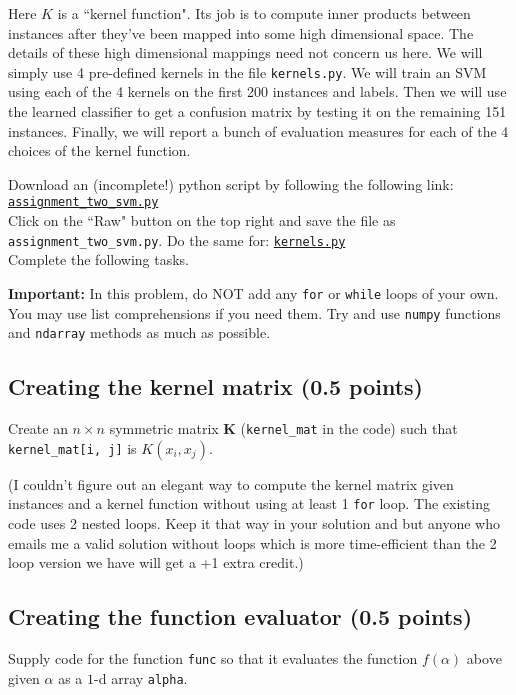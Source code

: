 \documentclass{article}
\begin{document}
Here $K$ is a ``kernel function". Its job is to compute inner products between instances after they've been mapped into some high dimensional space.
The details of these high dimensional mappings need not concern us here. We will simply use 4 pre-defined kernels in the file {\tt kernels.py}.
We will train an SVM using each of the 4 kernels on the first 200 instances and labels. Then we will use the learned classifier
to get a confusion matrix by testing it on the remaining 151 instances. Finally, we will report a bunch of evaluation measures for each
of the 4 choices of the kernel function.

Download an (incomplete!) python script by following the following
link:\\
\href{https://github.com/ambujtewari/stats607a-fall2017/blob/master/homeworks/assignment_two_svm.py}{\tt assignment\_two\_svm.py} \\
Click on the ``Raw" button on the top right and save the file as {\tt assignment\_two\_svm.py}.
Do the same for:
\href{https://github.com/ambujtewari/stats607a-fall2017/blob/master/homeworks/kernels.py}{\tt kernels.py} \\
Complete the following tasks.

{\bf Important:} In this problem, do NOT add any {\tt for} or {\tt while} loops of your own. You may use list comprehensions if you need them.
Try and use {\tt numpy} functions and {\tt ndarray} methods as much as possible.

\subsection{Creating the kernel matrix (0.5 points)}
Create an $n \times n$ symmetric matrix $\mathbf{K}$ ({\tt kernel\_mat} in the code) such that {\tt kernel\_mat[i, j]} is $K(x_i, x_j)$.

(I couldn't figure out an elegant way to compute the kernel matrix given instances and a kernel function without using at least 1 {\tt for}
loop. The existing code uses 2 nested loops. Keep it that way in your solution and but anyone who emails me a
valid solution without loops which is more time-efficient than the 2 loop version we have will get a +1 extra credit.)

\subsection{Creating the function evaluator (0.5 points)}

Supply code for the function {\tt func} so that it evaluates the function $f(\alpha)$ above given $\alpha$ as a $1$-d array {\tt alpha}.
\end{document}
